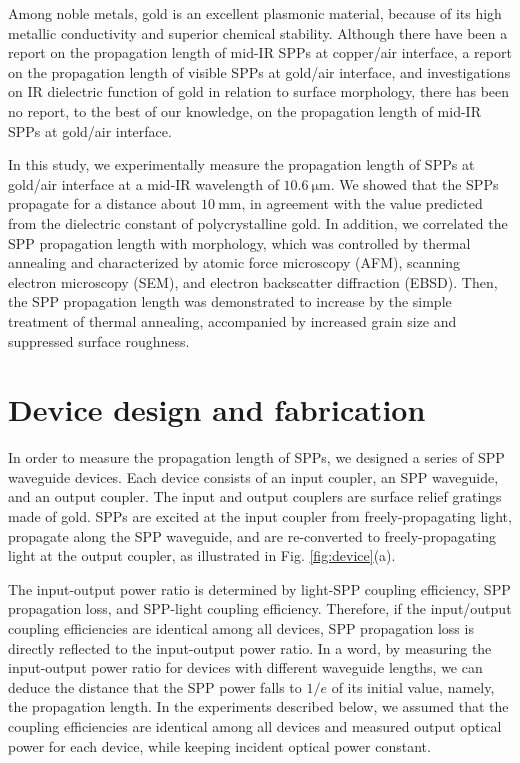 \documentclass[aip,apl,reprint]{revtex4-1}
\begin{document}
Among noble metals, gold is an excellent plasmonic material, because of its high metallic conductivity and superior chemical stability\cite{Zayats}. Although there have been a report on the propagation length of mid-IR SPPs at copper/air interface\cite{Shiba}, a report on the propagation length of visible SPPs at gold/air interface\cite{Kuttge}, and investigations on IR dielectric function of gold in relation to surface morphology\cite{Trollmann, Olmon}, there has been no report, to the best of our knowledge, on the propagation length of mid-IR SPPs at gold/air interface.

In this study, we experimentally measure the propagation length of SPPs at gold/air interface at a mid-IR wavelength of $10.6\:\mathrm{\mu m}$. We showed that the SPPs propagate for a distance about $10\:\mathrm{mm}$, in agreement with the value predicted from the dielectric constant of polycrystalline gold. In addition, we correlated the SPP propagation length with morphology, which was controlled by thermal annealing and characterized by atomic force microscopy (AFM), scanning electron microscopy (SEM), and electron backscatter diffraction (EBSD). Then, the SPP propagation length was demonstrated to increase by the simple treatment of thermal annealing, accompanied by increased grain size and suppressed surface roughness.

\section{Device design and fabrication}
\label{sec:device}
In order to measure the propagation length of SPPs, we designed a series of SPP waveguide devices. Each device consists of an input coupler, an SPP waveguide, and an output coupler.  The input and output couplers are surface relief gratings made of gold. SPPs are  excited at the input coupler from freely-propagating light, propagate along the SPP waveguide, and are re-converted to freely-propagating light at the output coupler, as illustrated in Fig. \ref{fig:device}(a). 

The input-output power ratio is determined by light-SPP coupling efficiency, SPP propagation loss, and SPP-light coupling efficiency. Therefore, if the input/output coupling efficiencies are identical among all devices, SPP propagation loss is directly reflected to the input-output power ratio. In a word, by measuring the input-output power ratio for devices with different waveguide lengths, we can deduce the distance that the SPP power falls to $1/e$ of its initial value, namely, the propagation length. In the experiments described below, we assumed that the coupling efficiencies are identical among all devices and measured output optical power for each device, while keeping incident optical power constant. 
\end{document}
